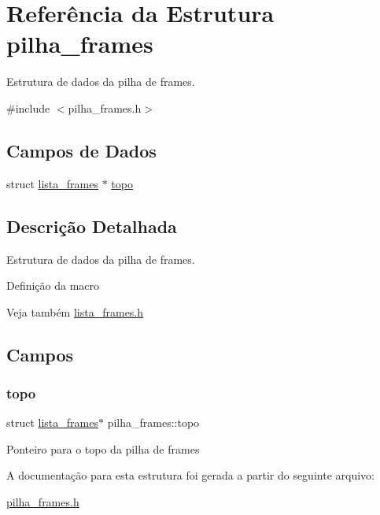 \hypertarget{structpilha__frames}{}\section{Referência da Estrutura pilha\+\_\+frames}
\label{structpilha__frames}


Estrutura de dados da pilha de frames.  




{\ttfamily \#include $<$pilha\+\_\+frames.\+h$>$}

\subsection*{Campos de Dados}
\begin{DoxyCompactItemize}
\item 
struct \hyperlink{structlista__frames}{lista\+\_\+frames} $\ast$ \hyperlink{structpilha__frames_a0f1e93df36de953f6ee6789cea5fd34f}{topo}
\end{DoxyCompactItemize}


\subsection{Descrição Detalhada}
Estrutura de dados da pilha de frames. 

Definição da macro

\begin{DoxySeeAlso}{Veja também}
\hyperlink{lista__frames_8h}{lista\+\_\+frames.\+h} 
\end{DoxySeeAlso}


\subsection{Campos}
\mbox{\label{structpilha__frames_a0f1e93df36de953f6ee6789cea5fd34f}} 
\subsubsection{\texorpdfstring{topo}{topo}}
{\footnotesize\ttfamily struct \hyperlink{structlista__frames}{lista\+\_\+frames}$\ast$ pilha\+\_\+frames\+::topo}

Ponteiro para o topo da pilha de frames 

A documentação para esta estrutura foi gerada a partir do seguinte arquivo\+:\begin{DoxyCompactItemize}
\item 
\hyperlink{pilha__frames_8h}{pilha\+\_\+frames.\+h}\end{DoxyCompactItemize}
